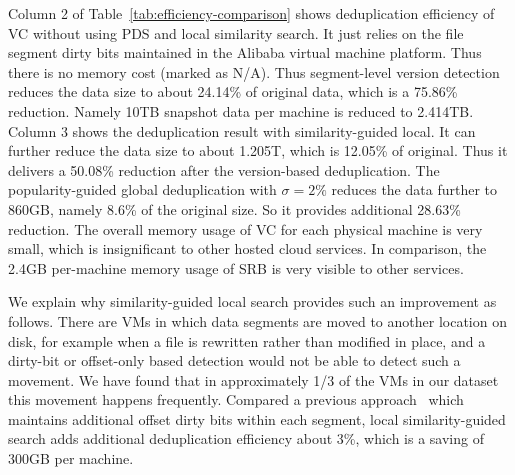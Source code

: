 Column 2 of Table~\ref{tab:efficiency-comparison} shows deduplication efficiency of VC without 
using PDS and local similarity search.
It just relies on the file segment dirty bits maintained in the Alibaba  virtual machine platform.
Thus there is no memory cost (marked as N/A).
Thus segment-level version detection 
reduces the data size to about 24.14\% of original data, 
which is a 75.86\% reduction. Namely 10TB snapshot data per machine is reduced to 2.414TB.
Column 3 shows the deduplication result with similarity-guided local.
It  can further reduce the data size
to about 1.205T, which is  12.05\% of original. Thus it delivers a 50.08\% reduction after the version-based
deduplication.
The popularity-guided global deduplication with $\sigma=2\% $
reduces the data further to 860GB, namely 8.6\% of the original size. 
So it provides additional 28.63\% reduction. 
The overall memory usage of VC for each physical machine is very small, which is insignificant to other 
hosted cloud services.  In comparison, the 2.4GB per-machine memory usage of SRB is very visible 
to other services.



We explain why similarity-guided local search provides such an improvement as follows.
There are VMs in which data  segments are moved to another location on disk, for example 
when a file is rewritten
rather than modified in place,  
and a dirty-bit or offset-only based detection would not be able to detect such a movement.
We have found that in
approximately 1/3 of the VMs in our dataset this movement happens frequently.
Compared a previous  approach~\cite{WeiZhangIEEE} which maintains additional offset dirty bits within each segment,
 local similarity-guided search adds additional  deduplication efficiency about 3\%,
which is a saving of 300GB per machine.

